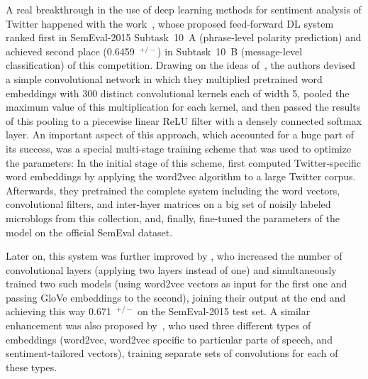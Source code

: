 A real breakthrough in the use of deep learning methods for sentiment
analysis of Twitter happened with the work~\citet{Severyn:15}, whose
proposed feed-forward DL system ranked first in SemEval-2015
Subtask~10~A (phrase-level polarity prediction) \cite{Rosenthal:15}
and achieved second place (0.6459~\F$^{+/-}$) in Subtask~10~B
(message-level classification) of this competition.  Drawing on the
ideas of~\citet{Kalchbrenner:14}, the authors devised a simple
convolutional network in which they multiplied pretrained word
embeddings with 300 distinct convolutional kernels each of width 5,
pooled the maximum value of this multiplication for each kernel, and
then passed the results of this pooling to a piecewise linear ReLU
filter with a densely connected softmax layer.  An important aspect of
this approach, which accounted for a huge part of its success, was a
special multi-stage training scheme that was used to optimize the
parameters: In the initial stage of this scheme,
\citeauthor{Severyn:15} first computed Twitter-specific word
embeddings by applying the word2vec algorithm to a large Twitter
corpus.  Afterwards, they pretrained the complete system including the
word vectors, convolutional filters, and inter-layer matrices on a big
set of noisily labeled microblogs from this collection, and, finally,
fine-tuned the parameters of the model on the official SemEval
dataset.

Later on, this system was further improved by \citet{Deriu:16}, who
increased the number of convolutional layers (applying two layers
instead of one) and simultaneously trained two such models (using
word2vec vectors as input for the first one and passing GloVe
embeddings to the second), joining their output at the end and
achieving this way 0.671~\F$^{+/-}$ on the SemEval-2015 test set.  A
similar enhancement was also proposed by~\citet{Rouvier:16}, who used
three different types of embeddings (word2vec, word2vec specific to
particular parts of speech, and sentiment-tailored vectors), training
separate sets of convolutions for each of these types.



